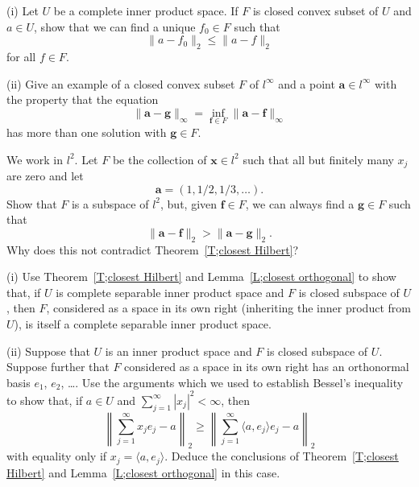 \begin{exercise}\label{E;closest convex}\label{C3.4}
(i) Let $U$ be a complete inner product space.
If $F$ is closed convex subset of $U$ and $a\in U$, 
show that  we can find a unique
$f_{0}\in F$ such that
\[\|a-f_{0}\|_{2}\leq\|a-f\|_{2}\]
for all $f\in F$.


(ii)  Give an example of a closed convex subset $F$ of $l^{\infty}$
and a point ${\mathbf a}\in l^{\infty}$
with the property that the equation
\[\|{\mathbf a}-{\mathbf g}\|_{\infty}=
\inf_{{\mathbf f}\in F}\|{\mathbf a}-{\mathbf f}\|_{\infty}\]
has more than one solution with ${\mathbf g}\in F$.
\end{exercise}
\begin{exercise}\label{E;not closed closest}\label{C3.5}
We work in $l^{2}$. Let $F$ be the collection of
${\mathbf x}\in l^{2}$ such that all but finitely many
$x_{j}$ are zero and let 
\[{\mathbf a}=(1,1/2,1/3,\dots).\]
Show that $F$ is a subspace of $l^{2}$, but,
given  ${\mathbf f}\in F$,
we can always find a ${\mathbf g}\in F$ such that
\[\|{\mathbf a}-{\mathbf f}\|_{2}>\|{\mathbf a}-{\mathbf g}\|_{2}.\]
Why does this not contradict Theorem~\ref{T;closest Hilbert}?
\end{exercise}
\begin{exercise}\label{C3.6} 
(i) Use Theorem~\ref{T;closest Hilbert}
and Lemma~\ref{L;closest orthogonal} to show that,
if $U$ is complete separable inner product space 
and $F$ is closed subspace of $U$, then $F$, considered
as a space in its own right (inheriting the inner product from $U$),
is itself a complete separable inner product space.

(ii) Suppose that $U$ is an inner product space 
and $F$ is closed subspace of $U$. Suppose further
that $F$ considered as
a space in its own right has an orthonormal basis $e_{1}$,
$e_{2}$, \dots. Use the arguments which we used to establish Bessel's
inequality to show that, if $a\in U$ and 
$\sum_{j=1}^{\infty}|x_{j}|^{2}<\infty$, then
\[\left\|\sum_{j=1}^{\infty}x_{j}e_{j}-a\right\|_{2}
\geq \left\|\sum_{j=1}^{\infty}\langle a,e_{j}\rangle e_{j}-a\right\|_{2}\]
with equality only if $x_{j}=\langle a,e_{j}\rangle$. Deduce
the conclusions of
Theorem~\ref{T;closest Hilbert}
and Lemma~\ref{L;closest orthogonal} in this case.
\end{exercise}

